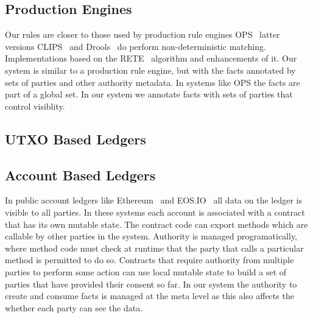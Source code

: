 

\subsection{Production Engines}
Our rules are closer to those used by production rule engines OPS~\cite{Forgy1981:OPS5} latter versions CLIPS~\cite{Riley2017:CLIPS} and Drools~\cite{Proctor2008:Drools} do perform non-deterministic matching. Implementations based on the RETE~\cite{Forgy1981:RETE} algorithm and enhancements \cite{Doorenbos1995:ProductionMatching} of it. Our system is similar to a production rule engine, but with the facts annotated by sets of parties and other authority metadata. In systems like OPS the facts are part of a global set. In our system we annotate facts with sets of parties that control visiblity.


\subsection{UTXO Based Ledgers}


\subsection{Account Based Ledgers}
In public account ledgers like Ethereum~\cite{Wood2014:Ethereum} and EOS.IO~\cite{Lee2018:EOSIO} all data on the ledger is visible to all parties. In these systems each account is associated with a contract that has its own mutable state. The contract code can export methods which are callable by other parties in the system. Authority is managed programatically, where method code must check at runtime that the party that calls a particular method is permitted to do so. Contracts that require authority from multiple parties to perform some action can use local mutable state to build a set of parties that have provided their consent so far. In our system the authority to create and consume facts is managed at the meta level as this also affects the whether each party can see the data.

